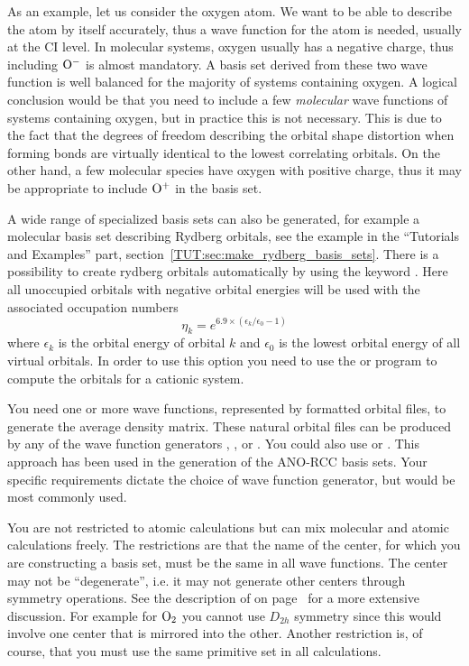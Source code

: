 As an example, let us consider the oxygen atom.
We want to be able to describe the atom by itself accurately,
thus a wave function for the atom is needed, usually at the CI level.
In molecular systems, oxygen usually has a negative charge, thus
including $\rm O^-$ is almost mandatory.
A basis set derived from these two wave function is well
balanced for the majority of systems containing oxygen.
A logical conclusion would be that you need to include a few
{\it molecular} wave functions of systems containing oxygen, but in
practice this is not necessary. This is due to the fact that
the degrees of freedom describing the orbital shape distortion
when forming bonds are virtually identical to the lowest
correlating orbitals.
On the other hand, a few molecular species have oxygen with
positive charge, thus it may be appropriate to include
$\rm O^+$ in the basis set.

A wide range of specialized basis sets can also be generated,
for example a molecular basis set describing Rydberg orbitals,
see the example in the ``Tutorials and Examples'' part,
section~\ref{TUT:sec:make_rydberg_basis_sets}.
There is a possibility to create rydberg orbitals
automatically by using the keyword
. Here all unoccupied orbitals with
negative orbital energies will be used with the associated
occupation numbers
\begin{equation}
\eta_k = e^{6.9\times(\epsilon_k/\epsilon_0-1)}
\end{equation}
where $\epsilon_k$ is the orbital energy of orbital $k$ and
$\epsilon_0$ is the lowest orbital energy of all
virtual orbitals. In order to use this option you need
to use the
 or  program to compute
the orbitals for a cationic system.

You need one or more wave functions,
represented by formatted orbital files,
to generate the average density matrix.
These natural orbital files can be produced by any of the
wave function generators
,
,
 or
.
You could also use
 or
.
This approach has been used in the generation of the ANO-RCC basis sets.
Your specific requirements dictate the choice of
wave function generator, but  would
be most commonly used.

You are not restricted to atomic calculations but
can mix molecular and atomic calculations freely.
The restrictions are that the name of the center, for which
you are constructing a basis set, must be the same
in all wave functions.
The center may not be ``degenerate'', i.e.
it may not generate other centers through symmetry
operations. See the description of 
on page~\pageref{UG:sec:seward}
for a more extensive discussion.
For example for $\rm O_2$ you cannot use $D_{2h}$ symmetry
since this would involve one center that is mirrored into the other.
Another restriction is, of course, that you must use the
same primitive set in all calculations.

